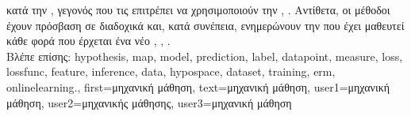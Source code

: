{{		 \foreignlanguage{greek}{κατά την} , \foreignlanguage{greek}{γεγονός που τις επιτρέπει 
		να χρησιμοποιούν την}  \cite{MLBasics}, \cite{HastieWainwrightBook}. \foreignlanguage{greek}{Αντίθετα, οι 
		μέθοδοι}  \foreignlanguage{greek}{έχουν πρόσβαση σε}  
		\foreignlanguage{greek}{διαδοχικά και, κατά συνέπεια, ενημερώνουν την}  \foreignlanguage{greek}{που έχει 
		μαθευτεί κάθε φορά που έρχεται ένα νέο}  \cite{PredictionLearningGames}, \cite{HazanOCO}, \cite{Bottou99}.
		\\
	 	\foreignlanguage{greek}{Βλέπε επίσης:} \gls{hypothesis}, \gls{map}, \gls{model}, \gls{prediction}, \gls{label}, \gls{datapoint}, \gls{measure}, 
		\gls{loss}, \gls{lossfunc}, \gls{feature}, \gls{inference}, \gls{data}, \gls{hypospace}, \gls{dataset}, \gls{training}, \gls{erm}, \gls{onlinelearning}.},
	first={\foreignlanguage{greek}{μηχανική μάθηση}},
	text={\foreignlanguage{greek}{μηχανική μάθηση}},
	user1={\foreignlanguage{greek}{μηχανική μάθηση}}, %
	user2={\foreignlanguage{greek}{μηχανικής μά\-θη\-σης}}, %
	user3={\foreignlanguage{greek}{μηχανική μάθηση}} %
}

